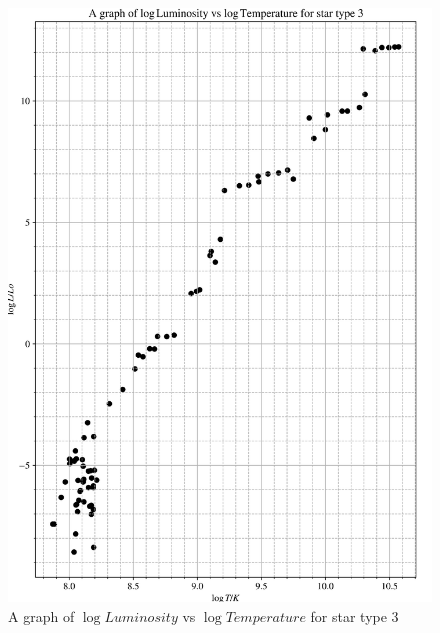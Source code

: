 \documentclass[12pt, a4paper]{article}
\begin{document}
\begin{figure}[H]
    \centering
    \includegraphics[width = \textwidth]{2Plot3.png}
    \caption{A graph of \(\log{Luminosity}\) vs \(\log{Temperature}\) for star type 3}
\end{figure}
\end{document}
